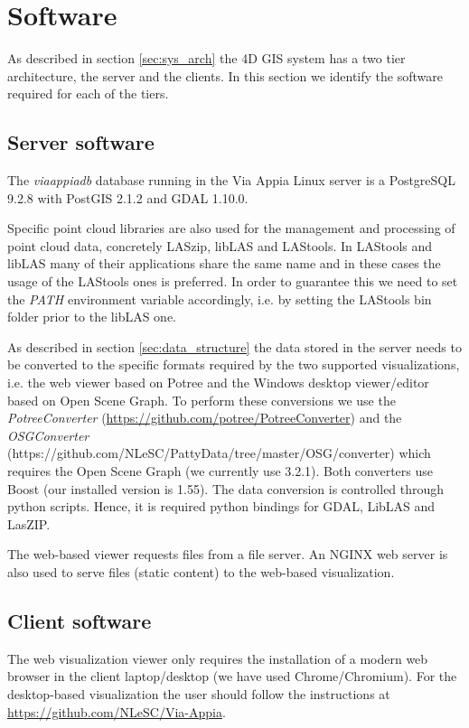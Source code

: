 \section{Software}
\label{sec:software}
As described in section \ref{sec:sys_arch} the 4D GIS system has a two tier
architecture, the server and the clients. In this section we identify the software
required for each of the tiers.

\subsection{Server software}
The \textit{viaappiadb} database running in the Via Appia Linux server is a
PostgreSQL 9.2.8 with PostGIS 2.1.2 and GDAL 1.10.0.

Specific point cloud libraries are also used for the management and processing
of point cloud data, concretely LASzip, libLAS and LAStools. In LAStools and
libLAS many of their applications share the same name and in these cases the
usage of the LAStools ones is preferred. In order to guarantee this we need to
set the \textit{PATH} environment variable accordingly, i.e. by setting the
LAStools bin folder prior to the libLAS one.

As described in section \ref{sec:data_structure} the data stored in the server
needs to be converted to the specific formats required by the two supported
visualizations, i.e. the web viewer based on Potree and the Windows desktop
viewer/editor based on Open Scene Graph. To perform these conversions we use
the \textit{PotreeConverter} ({\url{https://github.com/potree/PotreeConverter}}) and
the \textit{OSGConverter}
(https://github.com/NLeSC/PattyData/tree/master/OSG/converter) which requires the
Open Scene Graph (we currently use 3.2.1). Both converters use Boost (our
installed version is 1.55). The data conversion is controlled through python
scripts. Hence, it is required python bindings for GDAL, LibLAS and LasZIP. 

The web-based viewer requests files from a file server. An NGINX web server is
also used to serve files (static content) to the web-based visualization.

\subsection{Client software}
The web visualization viewer only requires the installation of a modern web
browser in the client laptop/desktop (we have used Chrome/Chromium). For the
desktop-based visualization the user should follow the instructions
at {\url{https://github.com/NLeSC/Via-Appia}}.
